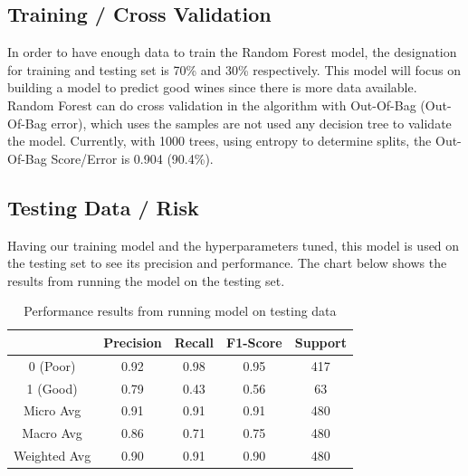 \documentclass[a4paper,titlepage]{article}
\begin{document}
	\subsection{Training / Cross Validation}
	In order to have enough data to train the Random Forest model, the designation for training and testing set is 70\% and 30\% respectively. This model will focus on building a model to predict good wines since there is more data available. Random Forest can do cross validation in the algorithm with Out-Of-Bag (Out-Of-Bag error), which uses the samples are not used any decision tree to validate the model. Currently, with 1000 trees, using entropy to determine splits, the Out-Of-Bag Score/Error is 0.904 (90.4\%). 
	\subsection{Testing Data / Risk}
	Having our training model and the hyperparameters tuned, this model is used on the testing set to see its precision and performance. The chart below shows the results from running the model on the testing set.
	\begin{table}[h]
		\centering
		\begin{tabular}{||c||c c c c||}
			\hline
			& \textbf{Precision} & \textbf{Recall} & \textbf{F1-Score} & \textbf{Support}\\
			\hline
			\hline
			0 (Poor)  	& 0.92 & 0.98 & 0.95 & 417\\
			1 (Good) & 0.79 & 0.43 & 0.56 & 63\\
			\hline
			\hline
			Micro Avg & 0.91 & 0.91 & 0.91 & 480\\
			Macro Avg & 0.86 & 0.71 & 0.75 & 480\\
			Weighted Avg & 0.90 & 0.91 & 0.90 & 480\\
			\hline
		\end{tabular}
		\caption{Performance results from running model on testing data}
	\end{table}
\end{document}
